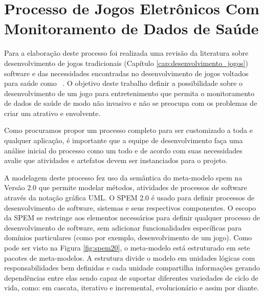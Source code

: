 \chapter{Processo de Jogos Eletrônicos Com Monitoramento de Dados de Saúde}

Para a elaboração deste processo foi realizada uma revisão da literatura sobre desenvolvimento de jogos tradicionais (Capítulo \ref{cap:desenvolvimento_jogos}) ~\cite{keith2010agile,moore2011basics,rucker2003,kanode2009} software e das necessidades encontradas no desenvolvimento de jogos voltados para saúde como ~\cite{Suhonen_2010,herber2011,bartolome11,sinclair07,Hardy2011,kato12}. O objetivo deste trabalho definir a possibilidade sobre o desenvolvimento de um jogo para entretenimento que permita o monitoramento de dados de saúde de modo não invasivo e não se preocupa com os problemas de criar um  atrativo e envolvente.


Como procuramos propor um processo completo para ser customizado a toda e qualquer aplicação, é importante que a equipe de desenvolvimento faça uma análise inicial do processo como um todo e de acordo com suas necessidades avalie que atividades e artefatos devem ser instanciados para o projeto.

A modelagem deste processo fez uso da semântica do meta-modelo \ac{spem} na Versão 2.0 \cite{spem08} que permite modelar métodos, atividades de processos de software através da notação gráfica UML. O SPEM 2.0 é usado para definir processos de desenvolvimento de software, sistemas e seus respectivos componentes. O escopo da SPEM se restringe aos elementos necessários para definir qualquer processo de desenvolvimento de software, sem adicionar funcionalidades específicas para domínios particulares (como por exemplo, desenvolvimento de um jogo). Como pode ser visto na Figura \ref{fig:spem20}, o meta-modelo está estruturado em sete pacotes de meta-modelos. A estrutura divide o modelo em unidades lógicas com responsabilidades bem definidas e cada unidade compartilha informações gerando dependências entre elas sendo capaz de suportar diferentes variedades de ciclo de vida, como: em cascata, iterativo e incremental, evolucionário e assim por diante.

